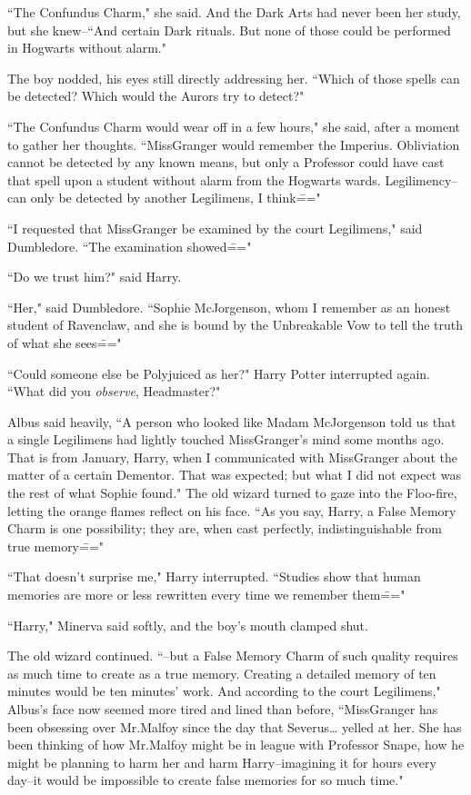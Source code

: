 ``The Confundus Charm," she said. And the Dark Arts had never been her study, but she knew\---``And certain Dark rituals. But none of those could be performed in Hogwarts without alarm."

The boy nodded, his eyes still directly addressing her. ``Which of those spells can be detected? Which would the Aurors try to detect?"

``The Confundus Charm would wear off in a few hours," she said, after a moment to gather her thoughts. ``Miss\?Granger would remember the Imperius. Obliviation cannot be detected by any known means, but only a Professor could have cast that spell upon a student without alarm from the Hogwarts wards. Legilimency\---can only be detected by another Legilimens, I think\==="

``I requested that Miss\?Granger be examined by the court Legilimens," said Dumbledore. ``The examination showed\==="

``Do we trust him?" said Harry.

``Her," said Dumbledore. ``Sophie McJorgenson, whom I remember as an honest student of Ravenclaw, and she is bound by the Unbreakable Vow to tell the truth of what she sees\==="

``Could someone else be Polyjuiced as her?" Harry Potter interrupted again. ``What did you \emph{observe}, Headmaster?"

Albus said heavily, ``A person who looked like Madam McJorgenson told us that a single Legilimens had lightly touched Miss\?Granger's mind some months ago. That is from January, Harry, when I communicated with Miss\?Granger about the matter of a certain Dementor. That was expected; but what I did not expect was the rest of what Sophie found." The old wizard turned to gaze into the Floo-fire, letting the orange flames reflect on his face. ``As you say, Harry, a False Memory Charm is one possibility; they are, when cast perfectly, indistinguishable from true memory\==="

``That doesn't surprise me," Harry interrupted. ``Studies show that human memories are more or less rewritten every time we remember them\==="

``Harry," Minerva said softly, and the boy's mouth clamped shut.

The old wizard continued. ``\---but a False Memory Charm of such quality requires as much time to create as a true memory. Creating a detailed memory of ten minutes would be ten minutes' work. And according to the court Legilimens," Albus's face now seemed more tired and lined than before, ``Miss\?Granger has been obsessing over Mr.\?Malfoy since the day that Severus{\ldots} yelled at her. She has been thinking of how Mr.\?Malfoy might be in league with Professor Snape, how he might be planning to harm her and harm Harry\---imagining it for hours every day\---it would be impossible to create false memories for so much time."

